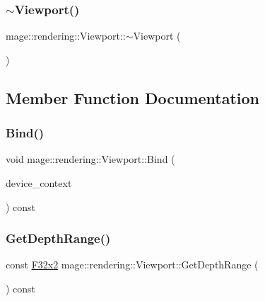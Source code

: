 \subsubsection{\texorpdfstring{$\sim$\+Viewport()}{~Viewport()}}
{\footnotesize\ttfamily mage\+::rendering\+::\+Viewport\+::$\sim$\+Viewport (\begin{DoxyParamCaption}{ }\end{DoxyParamCaption})\hspace{0.3cm}{\ttfamily [default]}}



\subsection{Member Function Documentation}
\hypertarget{classmage_1_1rendering_1_1_viewport_a8aeb392ce46ab413d607cdea36033e21}{}\label{classmage_1_1rendering_1_1_viewport_a8aeb392ce46ab413d607cdea36033e21} 
\subsubsection{\texorpdfstring{Bind()}{Bind()}}
{\footnotesize\ttfamily void mage\+::rendering\+::\+Viewport\+::\+Bind (\begin{DoxyParamCaption}\item[{I\+D3\+D11\+Device\+Context \&}]{device\+\_\+context }\end{DoxyParamCaption}) const\hspace{0.3cm}{\ttfamily [noexcept]}}

\hypertarget{classmage_1_1rendering_1_1_viewport_a50cb4c020709eddb8addb4420a59e1d0}{}\label{classmage_1_1rendering_1_1_viewport_a50cb4c020709eddb8addb4420a59e1d0} 
\subsubsection{\texorpdfstring{Get\+Depth\+Range()}{GetDepthRange()}}
{\footnotesize\ttfamily const \hyperlink{namespacemage_aa87237ad091f5cd7da612b8523fc108f}{F32x2} mage\+::rendering\+::\+Viewport\+::\+Get\+Depth\+Range (\begin{DoxyParamCaption}{ }\end{DoxyParamCaption}) const\hspace{0.3cm}{\ttfamily [noexcept]}}

